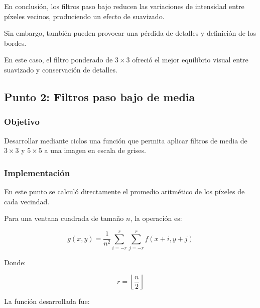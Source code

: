 \documentclass[11pt,letterpaper]{article}
\begin{document}
En conclusión, los filtros paso bajo
reducen las variaciones de intensidad
entre píxeles vecinos, produciendo
un efecto de suavizado.

Sin embargo, también pueden provocar
una pérdida de detalles y definición
de los bordes.

En este caso, el filtro ponderado
de $3\times3$ ofreció el mejor equilibrio
visual entre suavizado y conservación
de detalles.

\subsection{Punto 2: Filtros paso bajo de media}

\subsubsection*{Objetivo}

Desarrollar mediante ciclos una función
que permita aplicar filtros de media
de $3\times3$ y $5\times5$ a una imagen
en escala de grises.

\subsubsection*{Implementación}

En este punto se calculó directamente
el promedio aritmético de los píxeles
de cada vecindad.

Para una ventana cuadrada de tamaño $n$,
la operación es:

\[
g(x,y)=\frac{1}{n^2}
\sum_{i=-r}^{r}
\sum_{j=-r}^{r}
f(x+i,y+j)
\]

Donde:

\[
r=\left\lfloor\frac{n}{2}\right\rfloor
\]

La función desarrollada fue:
\end{document}
